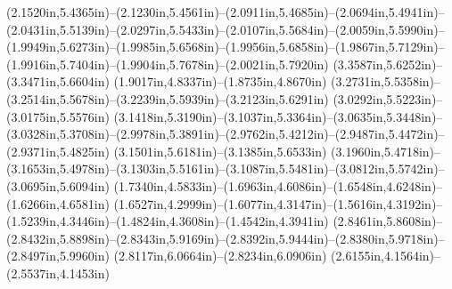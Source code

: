 (2.1520in,5.4365in)--(2.1230in,5.4561in)--(2.0911in,5.4685in)--(2.0694in,5.4941in)--(2.0431in,5.5139in)--(2.0297in,5.5433in)--(2.0107in,5.5684in)--(2.0059in,5.5990in)--(1.9949in,5.6273in)--(1.9985in,5.6568in)--(1.9956in,5.6858in)--(1.9867in,5.7129in)--(1.9916in,5.7404in)--(1.9904in,5.7678in)--(2.0021in,5.7920in) (3.3587in,5.6252in)--(3.3471in,5.6604in) (1.9017in,4.8337in)--(1.8735in,4.8670in) (3.2731in,5.5358in)--(3.2514in,5.5678in)--(3.2239in,5.5939in)--(3.2123in,5.6291in) (3.0292in,5.5223in)--(3.0175in,5.5576in) (3.1418in,5.3190in)--(3.1037in,5.3364in)--(3.0635in,5.3448in)--(3.0328in,5.3708in)--(2.9978in,5.3891in)--(2.9762in,5.4212in)--(2.9487in,5.4472in)--(2.9371in,5.4825in) (3.1501in,5.6181in)--(3.1385in,5.6533in) (3.1960in,5.4718in)--(3.1653in,5.4978in)--(3.1303in,5.5161in)--(3.1087in,5.5481in)--(3.0812in,5.5742in)--(3.0695in,5.6094in) (1.7340in,4.5833in)--(1.6963in,4.6086in)--(1.6548in,4.6248in)--(1.6266in,4.6581in) (1.6527in,4.2999in)--(1.6077in,4.3147in)--(1.5616in,4.3192in)--(1.5239in,4.3446in)--(1.4824in,4.3608in)--(1.4542in,4.3941in) (2.8461in,5.8608in)--(2.8432in,5.8898in)--(2.8343in,5.9169in)--(2.8392in,5.9444in)--(2.8380in,5.9718in)--(2.8497in,5.9960in) (2.8117in,6.0664in)--(2.8234in,6.0906in) (2.6155in,4.1564in)--(2.5537in,4.1453in)
